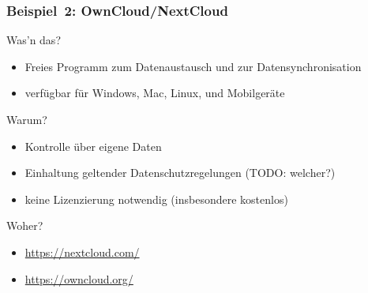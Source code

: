 \documentclass{beamer}
\begin{document}
\begin{frame}
  \frametitle{Beispiel~2: OwnCloud/NextCloud}

  \onslide<+->

  \begin{block}{Was'n das?}
    \begin{itemize}
    \item Freies Programm zum Datenaustausch und zur Datensynchronisation
    \item verfügbar für Windows, Mac, Linux, und Mobilgeräte
    \end{itemize}
  \end{block}

  \onslide<+->

  \begin{block}{Warum?}
    \begin{itemize}
    \item Kontrolle über eigene Daten
    \item Einhaltung geltender Datenschutzregelungen (TODO: welcher?)
    \item keine Lizenzierung notwendig (insbesondere kostenlos)
    \end{itemize}
  \end{block}

  \onslide<+->

  \begin{block}{Woher?}
    \begin{itemize}
    \item \url{https://nextcloud.com/}
    \item \url{https://owncloud.org/}
    \end{itemize}
  \end{block}


\end{frame}
\end{document}
